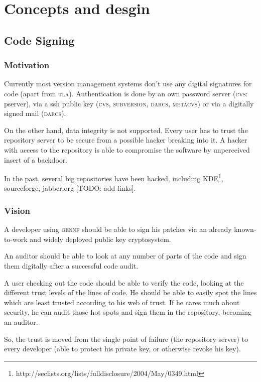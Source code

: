 \documentclass[fleqn, 10pt, a4paper]{report}
\begin{document}
\chapter{Concepts and desgin}

\section{Code Signing}

\subsection{Motivation}
Currently most version management systems don't use any digital signatures
for code (apart from \textsc{tla}). Authentication is done by an own password
server (\textsc{cvs}: pserver), via a ssh public key (\textsc{cvs},
\textsc{subversion}, \textsc{darcs}, \textsc{metacvs}) or
via a digitally signed mail (\textsc{darcs}).

On the other hand, data integrity is not supported.
Every user has to trust the repository server
to be secure from a possible hacker breaking into it.
A hacker with access to the repository is able to compromise the
software by unperceived insert of a backdoor.

In the past, several big repositories have been hacked, including
KDE\footnote{http://seclists.org/lists/fulldisclosure/2004/May/0349.html},
sourceforge, jabber.org [TODO: add links].


\subsection{Vision}
A developer using \textsc{gennf} should be able to sign his patches via
an already known-to-work and widely deployed public key cryptosystem.

An auditor should be able to look at any number of parts of the code
and sign them digitally after a successful code audit.

A user checking out the code should be able to verify the code, looking
at the different trust levels of the lines of code.
He should be able to easily spot the lines
which are least trusted according to his web of trust. If he cares much
about security, he can audit those hot spots and sign them in the repository,
becoming an auditor.

So, the trust is moved from the single point of failure (the repository
server) to every developer (able to protect his private key, or otherwise
revoke his key).
\end{document}
